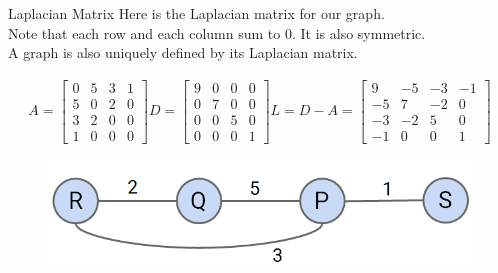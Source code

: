 \documentclass[aspectratio=169]{../latex_main/tntbeamer}  %
\begin{document}
	\begin{frame}{Laplacian Matrix}
	    Here is the Laplacian matrix for our graph.\\
        Note that each row and each column sum to 0. It is also symmetric.\\
        A graph is also uniquely defined by its Laplacian matrix.

	    \begin{align*}
	        A = \left[\begin{array}{cccc}
	            0 & 5 & 3 & 1 \\
	            5 & 0 & 2 & 0 \\
	            3 & 2 & 0 & 0 \\
	            1 & 0 & 0 & 0
	        \end{array}\right] 
	        D = \left[\begin{array}{cccc}
	            9 & 0 & 0 & 0 \\
	            0 & 7 & 0 & 0 \\
	            0 & 0 & 5 & 0 \\
	            0 & 0 & 0 & 1
	        \end{array}\right] 
	        L = D-A =  \left[\begin{array}{cccc}
	            9 & -5 & -3 & -1 \\
	            -5 & 7 & -2 & 0 \\
	            -3 & -2 & 5 & 0 \\
	            -1 & 0 & 0 & 1
	        \end{array}\right] 
	    \end{align*}
	    \begin{figure}
	        \centering
	        \includegraphics[scale=.5]{Bild15}
	    \end{figure}
	\end{frame}
	
	
	
\end{document}

